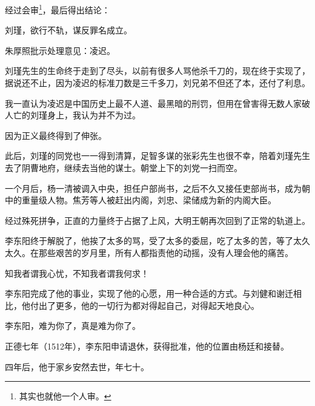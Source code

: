 \begin{multicols}{\theparacolNo}
经过会审\footnote{其实也就他一个人审。}，最后得出结论：

刘瑾，欲行不轨，谋反罪名成立。

朱厚照批示处理意见：凌迟。

刘瑾先生的生命终于走到了尽头，以前有很多人骂他杀千刀的，现在终于实现了，据说还不止，因为凌迟的标准刀数是三千多刀，刘兄弟不但还了本，还付了利息。

我一直认为凌迟是中国历史上最不人道、最黑暗的刑罚，但用在曾害得无数人家破人亡的刘瑾身上，我认为并不为过。

因为正义最终得到了伸张。

此后，刘瑾的同党也一一得到清算，足智多谋的张彩先生也很不幸，陪着刘瑾先生去了阴曹地府，继续去当他的谋士。朝堂上下的刘党一扫而空。

一个月后，杨一清被调入中央，担任户部尚书，之后不久又接任吏部尚书，成为朝中的重量级人物。焦芳等人被赶出内阁，刘忠、梁储成为新的内阁大臣。

经过殊死拼争，正直的力量终于占据了上风，大明王朝再次回到了正常的轨道上。

李东阳终于解脱了，他挨了太多的骂，受了太多的委屈，吃了太多的苦，等了太久太久。在那些艰苦的岁月里，所有人都指责他的动摇，没有人理会他的痛苦。

知我者谓我心忧，不知我者谓我何求！

李东阳完成了他的事业，实现了他的心愿，用一种合适的方式。与刘健和谢迁相比，他付出了更多，他的一切行为都对得起自己，对得起天地良心。

李东阳，难为你了，真是难为你了。

正德七年（1512年），李东阳申请退休，获得批准，他的位置由杨廷和接替。

四年后，他于家乡安然去世，年七十。
\ifnum{}
	\end{multicols}
\fi
\newpage
